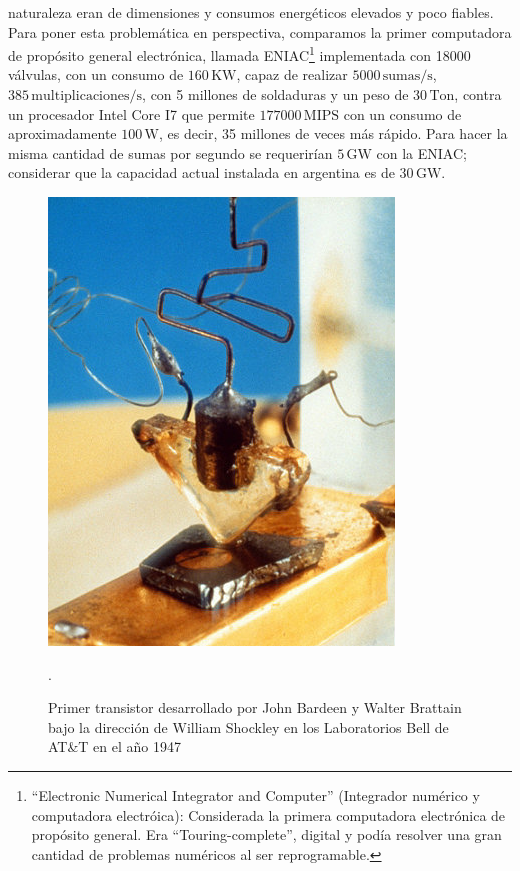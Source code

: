 naturaleza eran de dimensiones y consumos energéticos elevados y poco fiables. Para poner esta problemática en perspectiva, comparamos la primer computadora de propósito general electrónica, llamada ENIAC\footnote{``Electronic Numerical Integrator and Computer'' (Integrador numérico y computadora electróica): Considerada la primera computadora electrónica de propósito general. Era ``Touring-complete'', digital y podía resolver una gran cantidad de problemas numéricos al ser reprogramable.} implementada con 18000 válvulas, con un consumo de $160\,\mathrm{KW}$, capaz de realizar $5000\,\mathrm{sumas/s}$, $385\,\mathrm{multiplicaciones/s}$, con 5 millones de soldaduras y un peso de $30\,\mathrm{Ton}$, contra un procesador Intel Core I7 que permite $177000\,\mathrm{MIPS}$ con un consumo de aproximadamente $100\,\mathrm{W}$, es decir, 35 millones de veces más rápido. Para hacer la misma cantidad de sumas por segundo se requerirían $5\,\mathrm{GW}$ con la ENIAC; considerar que la capacidad actual instalada en argentina es de $30\,\mathrm{GW}$.
\begin{figure}
  \centering
  \includegraphics[scale=0.5]{./figures/C02-primer_transistor}
  \captionsetup{justification=centering}
  \caption{Primer transistor desarrollado por John Bardeen y Walter Brattain bajo la dirección de William Shockley en los Laboratorios Bell de AT\&T en el año 1947}.
  \label{fig:C02-primer_transistor}
\end{figure}

